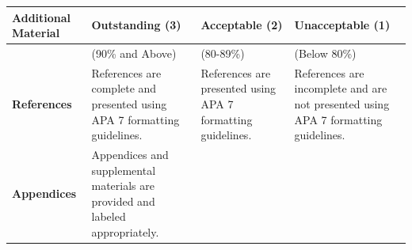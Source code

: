 \documentclass[
  openany]{book}
\begin{document}
\begin{longtable}[]{@{}llll@{}}
\toprule
\begin{minipage}[b]{0.22\columnwidth}\raggedright
Additional Material\strut
\end{minipage} & \begin{minipage}[b]{0.22\columnwidth}\raggedright
Outstanding (3)\strut
\end{minipage} & \begin{minipage}[b]{0.22\columnwidth}\raggedright
Acceptable (2)\strut
\end{minipage} & \begin{minipage}[b]{0.22\columnwidth}\raggedright
Unacceptable (1)\strut
\end{minipage}\tabularnewline
\midrule
\endhead
\begin{minipage}[t]{0.22\columnwidth}\raggedright
\strut
\end{minipage} & \begin{minipage}[t]{0.22\columnwidth}\raggedright
(90\% and Above)\strut
\end{minipage} & \begin{minipage}[t]{0.22\columnwidth}\raggedright
(80-89\%)\strut
\end{minipage} & \begin{minipage}[t]{0.22\columnwidth}\raggedright
(Below 80\%)\strut
\end{minipage}\tabularnewline
\begin{minipage}[t]{0.22\columnwidth}\raggedright
\textbf{References}\strut
\end{minipage} & \begin{minipage}[t]{0.22\columnwidth}\raggedright
References are complete and presented using APA 7 formatting guidelines.\strut
\end{minipage} & \begin{minipage}[t]{0.22\columnwidth}\raggedright
References are presented using APA 7 formatting guidelines.\strut
\end{minipage} & \begin{minipage}[t]{0.22\columnwidth}\raggedright
References are incomplete and are not presented using APA 7 formatting guidelines.\strut
\end{minipage}\tabularnewline
\begin{minipage}[t]{0.22\columnwidth}\raggedright
\textbf{Appendices}\strut
\end{minipage} & \begin{minipage}[t]{0.22\columnwidth}\raggedright
Appendices and supplemental materials are provided and labeled appropriately.\strut

\end{minipage}
\end{longtable}
\end{document}
